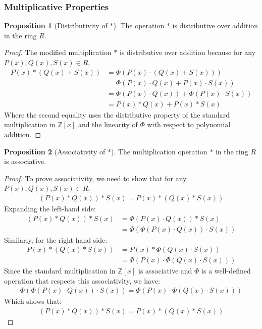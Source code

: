\documentclass{article}
\theoremstyle{plain}
\theoremstyle{definition}
\newtheorem{proposition}{Proposition}
\newcommand{\redu}{\Phi}
\begin{document}
\subsubsection{Multiplicative Properties}
\begin{proposition}[Distributivity of \(\ast\)] \label{proposition:ring:1}
The operation \(\ast\) is distributive over addition in the ring \(R\).
\end{proposition}
\begin{proof}
The modified multiplication \(\ast\) is distributive over addition because for any \( P(x), Q(x), S(x) \in R \),
\begin{align}
    P(x) \ast (Q(x) + S(x)) &= \redu(P(x) \cdot (Q(x) + S(x))) \\
    &= \redu(P(x) \cdot Q(x) + P(x) \cdot S(x)) \\
    &= \redu(P(x) \cdot Q(x)) + \redu(P(x) \cdot S(x)) \\
    &= P(x) \ast Q(x) + P(x) \ast S(x)
\end{align}
Where the second equality uses the distributive property of the standard multiplication in \( \mathbb{Z}[x] \) and the linearity of \(\redu\) with respect to polynomial addition.
\end{proof}

\begin{proposition}[Associativity of \(\ast\)] \label{proposition:ring:2}
The multiplication operation \(\ast\) in the ring \(R\) is associative.
\end{proposition}
\begin{proof}
To prove associativity, we need to show that for any \( P(x), Q(x), S(x) \in R \):
\begin{align}
    (P(x) \ast Q(x)) \ast S(x) = P(x) \ast (Q(x) \ast S(x))
\end{align}
Expanding the left-hand side:
\begin{align}
    (P(x) \ast Q(x)) \ast S(x) &= \redu(P(x) \cdot Q(x)) \ast S(x) \\
    &= \redu(\redu(P(x) \cdot Q(x)) \cdot S(x))
\end{align}
Similarly, for the right-hand side:
\begin{align}
    P(x) \ast (Q(x) \ast S(x)) &= P(x) \ast \redu(Q(x) \cdot S(x)) \\
    &= \redu(P(x) \cdot \redu(Q(x) \cdot S(x)))
\end{align}
Since the standard multiplication in \(\mathbb{Z}[x]\) is associative and \(\redu\) is a well-defined operation that respects this associativity, we have:
\begin{align}
    \redu(\redu(P(x) \cdot Q(x)) \cdot S(x)) = \redu(P(x) \cdot \redu(Q(x) \cdot S(x)))
\end{align}
Which shows that:
\begin{align}
    (P(x) \ast Q(x)) \ast S(x) = P(x) \ast (Q(x) \ast S(x))
\end{align}
\end{proof}
\end{document}
